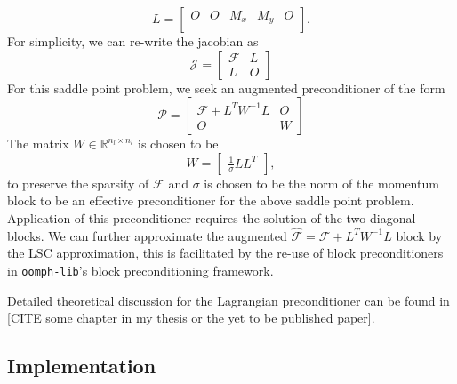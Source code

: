 \begin{equation*}
	L =
\begin{bmatrix}
 O & O & M_x & M_y & O \\
\end{bmatrix}.
\end{equation*}
For simplicity, we can re-write the jacobian as
\begin{equation*}
	\mathcal{J} = 
	\begin{bmatrix}
	 \mathcal{F} & L\\
	L & \mathit{O}
	\end{bmatrix}
\end{equation*}
For this saddle point problem, we seek an augmented preconditioner of the form
\begin{equation*}
	\mathcal{P} = 
	\begin{bmatrix}
	 \mathcal{F}+ L^T W^{-1} L & \mathit{O}\\
	\mathit{O} & W
	\end{bmatrix}
\end{equation*}
The matrix $W\in \mathbb{R}^{n_l \times n_l}$ is chosen to be
 \begin{equation}
 	W = 
 	\begin{bmatrix}
 	\frac{1}{\sigma}L L^T
 	\end{bmatrix},
 	\label{eq:W}
 \end{equation}
to preserve the sparsity of $\mathcal{F}$ and $\sigma$ is chosen to be the norm of the momentum block to be an effective preconditioner for the above saddle point problem. Application of this preconditioner requires the solution of the two diagonal blocks. We can further approximate the augmented $\hat{\mathcal{F}} = \mathcal{F} + L^TW^{-1}L$ block by the LSC approximation, this is facilitated by the re-use of block preconditioners in \verb+oomph-lib+'s block preconditioning framework.

Detailed theoretical discussion for the Lagrangian preconditioner can be found in [CITE some chapter in my thesis or the yet to be published paper].
\subsection{Implementation\label{sec:lgr_implementation}}

